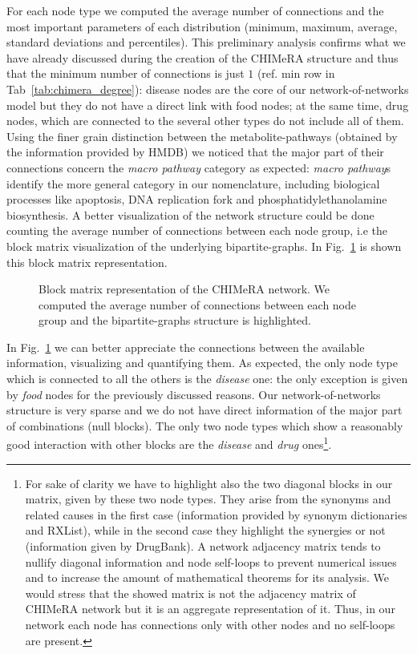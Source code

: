 \documentclass{standalone}
\begin{document}
For each node type we computed the average number of connections and the most important parameters of each distribution (minimum, maximum, average, standard deviations and percentiles).
This preliminary analysis confirms what we have already discussed during the creation of the \textsf{CHIMeRA} structure and thus that the minimum number of connections is just $1$ (ref. min row in Tab~\ref{tab:chimera_degree}): disease nodes are the core of our network-of-networks model but they do not have a direct link with food nodes; at the same time, drug nodes, which are connected to the several other types do not include all of them.
Using the finer grain distinction between the metabolite-pathways (obtained by the information provided by HMDB) we noticed that the major part of their connections concern the \emph{macro pathway} category as expected: \emph{macro pathway}s identify the more general category in our nomenclature, including biological processes like \textsf{apoptosis}, \textsf{DNA replication fork} and \textsf{phosphatidylethanolamine biosynthesis}.
A better visualization of the network structure could be done counting the average number of connections between each node group, i.e the block matrix visualization of the underlying bipartite-graphs.
In Fig.~\ref{fig:chimera_bipartite} is shown this block matrix representation.

\begin{figure}[htbp]
\centering
\def\svgwidth{\textwidth}

\caption{Block matrix representation of the \textsf{CHIMeRA} network.
We computed the average number of connections between each node group and the bipartite-graphs structure is highlighted.
}
\label{fig:chimera_bipartite}
\end{figure}

In Fig.~\ref{fig:chimera_bipartite} we can better appreciate the connections between the available information, visualizing and quantifying them.
As expected, the only node type which is connected to all the others is the \emph{disease} one: the only exception is given by \emph{food} nodes for the previously discussed reasons.
Our network-of-networks structure is very sparse and we do not have direct information of the major part of combinations (null blocks).
The only two node types which show a reasonably good interaction with other blocks are the \emph{disease} and \emph{drug} ones\footnote{
  For sake of clarity we have to highlight also the two diagonal blocks in our matrix, given by these two node types.
  They arise from the synonyms and related causes in the first case (information provided by synonym dictionaries and RXList), while in the second case they highlight the synergies or not (information given by DrugBank).
  A network adjacency matrix tends to nullify diagonal information and node self-loops to prevent numerical issues and to increase the amount of mathematical theorems for its analysis.
  We would stress that the showed matrix is not the adjacency matrix of \textsf{CHIMeRA} network but it is an aggregate representation of it.
  Thus, in our network each node has connections only with other nodes and no self-loops are present.
}.
\end{document}
